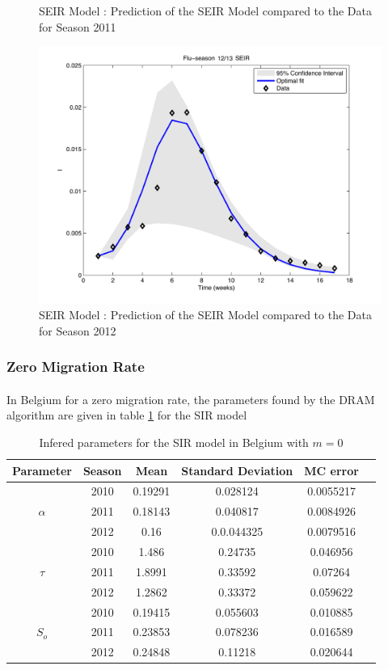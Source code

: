 \documentclass[11pt, a4paper]{article}
\begin{document}
\begin{figure}[h]
    \caption{SEIR Model : Prediction of the SEIR Model compared to the Data for Season 2011}
    \label{fig:seir_pred2}
    \includegraphics[height = 0.25\textheight]{figures/SEIR_prediction_season3.pdf}
    \caption{SEIR Model : Prediction of the SEIR Model compared to the Data for Season 2012}
    \label{fig:seir_pred3}
\end{figure}

\subsubsection{Zero Migration Rate}
\paragraph{}
In Belgium for a zero migration rate, the parameters found by the DRAM algorithm are given in table \ref{tab:sirm0DRAM} for the SIR model
\begin{table}[h]
\FloatBarrier
\centering
\begin{tabular}{| c | c | c | c | c | c |}
    \hline
    Parameter & Season  & Mean &  Standard Deviation & MC error\\ \hline
    \multirow{3}{*}{$\alpha$} & 2010 & 0.19291 & 0.028124 &  0.0055217 \\
    & 2011 & 0.18143 & 0.040817 & 0.0084926 \\
    & 2012 & 0.16 & 0.0.044325 & 0.0079516 \\ \hline
    \multirow{3}{*}{$\tau$} & 2010 & 1.486 & 0.24735 & 0.046956\\ 
    & 2011 & 1.8991 & 0.33592 & 0.07264 \\ 
    & 2012 & 1.2862 & 0.33372 & 0.059622 \\ \hline
    \multirow{3}{*}{$S_o$} & 2010 & 0.19415 & 0.055603 & 0.010885 \\
    & 2011 & 0.23853 & 0.078236 & 0.016589 \\ 
    & 2012 & 0.24848 & 0.11218 & 0.020644 \\ \hline
    \end{tabular}
    \caption{Infered parameters for the SIR model in Belgium with $m=0$}
    \label{tab:sirm0DRAM}
\end{table}
\end{document}

